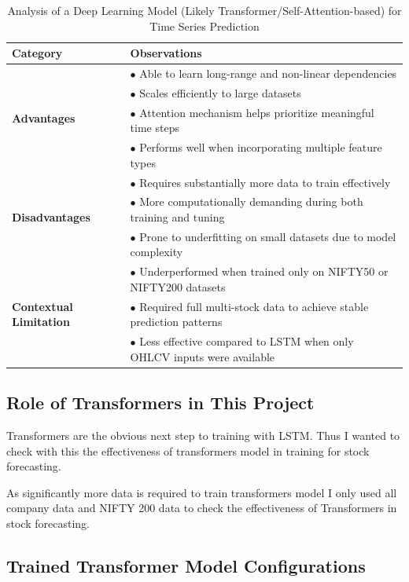 \begin{table}[h]
\centering
\caption{Analysis of a Deep Learning Model (Likely Transformer/Self-Attention-based) for Time Series Prediction}
\label{tab:model_analysis}
\begin{tabular}{|p{}|p{}|}
\hline
\textbf{Category} & \textbf{Observations} \\
\hline
\multirow{4}{*}{\textbf{Advantages}} & $\bullet$ Able to learn long-range and non-linear dependencies \\
& $\bullet$ Scales efficiently to large datasets \\
& $\bullet$ Attention mechanism helps prioritize meaningful time steps \\
& $\bullet$ Performs well when incorporating multiple feature types \\
\hline
\multirow{3}{*}{\textbf{Disadvantages}} & $\bullet$ Requires substantially more data to train effectively \\
& $\bullet$ More computationally demanding during both training and tuning \\
& $\bullet$ Prone to underfitting on small datasets due to model complexity \\
\hline
\multirow{4}{*}{\textbf{Contextual Limitation}} & $\bullet$ Underperformed when trained only on NIFTY50 or NIFTY200 datasets \\
& $\bullet$ Required full multi-stock data to achieve stable prediction patterns \\
& $\bullet$ Less effective compared to LSTM when only OHLCV inputs were available \\
\hline
\end{tabular}
\end{table}

\subsection{Role of Transformers in This Project}

Transformers are the obvious next step to training with LSTM. Thus I wanted to check with this the effectiveness of transformers model in training for stock forecasting. 

As significantly more data is required to train transformers model I only used all company data and NIFTY 200 data to check the effectiveness of Transformers in stock forecasting.

\subsection{Trained Transformer Model Configurations}

